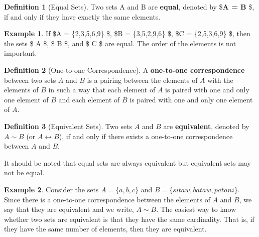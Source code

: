 \documentclass[]{book}
\theoremstyle{definition}
\newtheorem{definition}{Definition}[chapter]
\theoremstyle{definition}
\newtheorem{example}{Example}[chapter]
\theoremstyle{definition}
\theoremstyle{remark}
\begin{document}
\begin{definition}[Equal Sets]
\protect\hypertarget{def:unnamed-chunk-8}{}{\label{def:unnamed-chunk-8} \iffalse (Equal Sets) \fi{} }Two sets A and B are \textbf{equal}, denoted by \$\textbf{A = B} \$, if and only if they have exactly the same elements.
\end{definition}

\begin{example}
\protect\hypertarget{exm:unnamed-chunk-9}{}{\label{exm:unnamed-chunk-9} }If \$A = \{2,3,5,6,9\} \$, \$B = \{3,5,2,9,6\} \$, \$C = \{2,5,3,6,9\} \$, then the sets \$ A \$, \$ B \$, and \$ C \$ are equal. The order of the elements is not important.
\end{example}

\begin{definition}[One-to-one Correspondence]
\protect\hypertarget{def:unnamed-chunk-10}{}{\label{def:unnamed-chunk-10} \iffalse (One-to-one Correspondence) \fi{} }A \textbf{one-to-one correspondence} between two sets \(A\) and \(B\) is a pairing between the elements of \(A\) with the elements of \(B\) in such a way that each element of \(A\) is paired with one and only one element of \(B\) and each element of \(B\) is paired with one and only one element of \(A\).
\end{definition}

\begin{definition}[Equivalent Sets]
\protect\hypertarget{def:unnamed-chunk-11}{}{\label{def:unnamed-chunk-11} \iffalse (Equivalent Sets) \fi{} }Two sets \(A\) and \(B\) are \textbf{equivalent}, denoted by \(A \sim B\) (or \(A \leftrightarrow B\)), if and only if there exists a one-to-one correspondence between \(A\) and \(B\).
\end{definition}

It should be noted that equal sets are always equivalent but equivalent sets may not be equal.

\begin{example}
\protect\hypertarget{exm:unnamed-chunk-12}{}{\label{exm:unnamed-chunk-12} }Consider the sets \(A = \{a,b,c\}\) and \(B = \{sitaw, bataw, patani\}\). Since there is a one-to-one correspondence between the elements of \(A\) and \(B\), we say that they are equivalent and we write, \(A \sim B\). The easiest way to know whether two sets are equivalent is that they have the same cardinality. That is, if they have the same number of elements, then they are equivalent.
\end{example}
\end{document}
